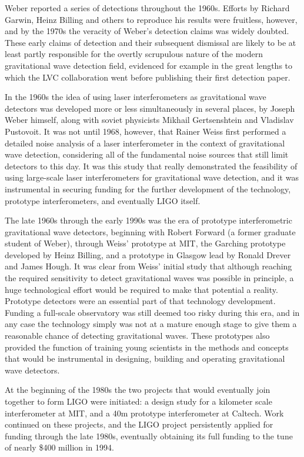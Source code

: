 Weber reported a series of detections throughout the 1960s. Efforts by Richard Garwin, Heinz Billing and others 
to reproduce his results were fruitless, however, and by the 1970s the veracity of Weber's detection claims was widely doubted. 
These early claims of detection and their subsequent dismissal are likely to be at least partly responsible for the 
overtly scrupulous nature of the modern gravitational wave detection field, evidenced for example in the great lengths to which 
the LVC collaboration went before publishing their first detection paper.

In the 1960s the idea of using laser interferometers as gravitational wave detectors was developed more or less simultaneously 
in several places, by Joseph Weber himself, along with soviet physicists Mikhail Gertsenshtein and Vladislav Pustovoit. 
It was not until 1968, however, that Rainer Weiss first performed a detailed noise analysis of a laser interferometer in the context 
of gravitational wave detection, considering all of the fundamental noise sources that still limit detectors to this day. 
It was this study that really demonstrated the feasibility of using large-scale laser interferometers for gravitational wave detection, and 
it was instrumental in securing funding for the further development of the technology, prototype interferometers, and eventually LIGO itself. 

The late 1960s through the early 1990s was the era of prototype interferometric gravitational wave detectors, beginning with 
Robert Forward (a former graduate student of Weber), through Weiss' prototype at MIT, the Garching prototype developed by 
Heinz Billing, and a prototype in Glasgow lead by Ronald Drever and James Hough. 
It was clear from Weiss' initial 
study that although reaching the required sensitivity to detect gravitational waves was possible in principle, a huge technological effort would 
be required to make that potential a reality. 
Prototype detectors were an essential part of that technology development. Funding a full-scale 
observatory was still deemed too risky during this era, and in any case the technology simply was not at a mature enough stage to give them 
a reasonable chance of detecting gravitational waves. These prototypes also provided the function 
of training young scientists in the methods and concepts that would be instrumental in 
designing, building and operating gravitational wave detectors. 

At the beginning of the 1980s the two projects that would eventually join together to form LIGO were initiated: 
a design study for a kilometer scale interferometer at MIT, and a 40m 
prototype interferometer at Caltech. Work continued on these projects, and the LIGO project persistently applied 
for funding through the late 1980s, eventually obtaining its full funding to the tune of nearly \$400 million in 1994. 

